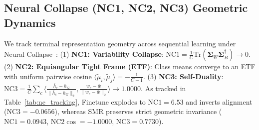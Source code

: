 \documentclass{article}
\begin{document}
\begin{table}[htbp]
\centering
\caption{Comprehensive Hyperparameter Configuration for Sparse Mechanistic Routing (SMR).}
\label{tab:hyperparams}
\vskip 0.05in
\end{table}

\subsection{Neural Collapse (NC1, NC2, NC3) Geometric Dynamics}
\label{sec:app_nc}
We track terminal representation geometry across sequential learning under Neural Collapse~\cite{papyan2020prevalence}:
(1) \textbf{NC1: Variability Collapse}: $\text{NC1} = \frac{1}{C}\text{Tr}(\mathbf{\Sigma}_W \mathbf{\Sigma}_B^\dagger) \to 0$.
(2) \textbf{NC2: Equiangular Tight Frame (ETF)}: Class means converge to an ETF with uniform pairwise cosine $\langle \tilde{\mu}_i, \tilde{\mu}_j \rangle = -\frac{1}{C-1}$.
(3) \textbf{NC3: Self-Duality}: $\text{NC3} = \frac{1}{C}\sum_c \langle \frac{\bar{h}_c - h_G}{\|\bar{h}_c - h_G\|_2}, \frac{w_c - \bar{w}}{\|w_c - \bar{w}\|_2} \rangle \to 1.0000$.
As tracked in Table~\ref{tab:nc_tracking}, Finetune explodes to $\text{NC1} = 6.53$ and inverts alignment ($\text{NC3} = -0.0656$), whereas SMR preserves strict geometric invariance ($\text{NC1} = 0.0943$, $\text{NC2} \cos = -1.0000$, $\text{NC3} = 0.7730$).
\end{document}
